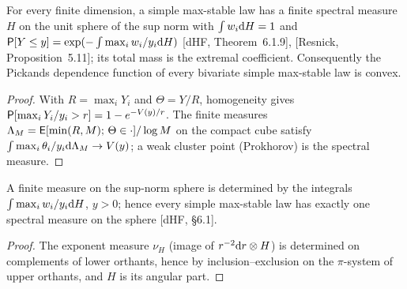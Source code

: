 \begin{theorem}
  \label{thm:max-stable-converse}
  \leanok
  For every finite dimension, a simple max-stable law has a finite spectral measure $H$ on the unit sphere of the sup
  norm with $\int w_i \mathrm{d} H = 1$ and $\mathsf{P}[Y \le y] = \exp(-\int \max_i w_i/y_i \mathrm{d} H)$ [dHF, Theorem~6.1.9],
  [Resnick, Proposition~5.11]; its total mass is the extremal coefficient. Consequently the Pickands dependence
  function of every bivariate simple max-stable law is convex.
\end{theorem}
\begin{proof}
  \leanok
  With $R = \max_i Y_i$ and $\Theta = Y/R$, homogeneity gives $\mathsf{P}[\max_i Y_i/y_i > r] = 1 - e^{-V(y)/r}$. The finite measures
  $\Lambda_M = \mathsf{E}[\min(R, M);\, \Theta \in \cdot]/\log M$ on the compact cube satisfy $\int \max_i \theta_i/y_i \mathrm{d}\Lambda_M \to V(y)$; a weak
  cluster point (Prokhorov) is the spectral measure.
\end{proof}

\begin{theorem}
  \label{thm:max-stable-unique}
  \leanok
  A finite measure on the sup-norm sphere is determined by the integrals $\int \max_i w_i/y_i \mathrm{d} H$, $y > 0$; hence every simple
  max-stable law has exactly one spectral measure on the sphere [dHF, \S6.1].
\end{theorem}
\begin{proof}
  \leanok
  The exponent measure $\nu_H$ (image of $r^{-2}\mathrm{d} r \otimes H$) is determined on complements of lower orthants, hence by
  inclusion--exclusion on the $\pi$-system of upper orthants, and $H$ is its angular part.
\end{proof}

